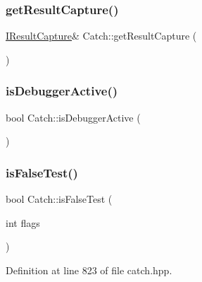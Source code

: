 \hypertarget{namespace_catch_aff60c1de6ac6cea30175d70e33d83c8e}{}\label{namespace_catch_aff60c1de6ac6cea30175d70e33d83c8e} 
\subsubsection{\texorpdfstring{get\+Result\+Capture()}{getResultCapture()}}
{\footnotesize\ttfamily \hyperlink{struct_catch_1_1_i_result_capture}{I\+Result\+Capture}\& Catch\+::get\+Result\+Capture (\begin{DoxyParamCaption}{ }\end{DoxyParamCaption})}

\hypertarget{namespace_catch_ab079497368fb1df25af39ad494d2a241}{}\label{namespace_catch_ab079497368fb1df25af39ad494d2a241} 
\subsubsection{\texorpdfstring{is\+Debugger\+Active()}{isDebuggerActive()}}
{\footnotesize\ttfamily bool Catch\+::is\+Debugger\+Active (\begin{DoxyParamCaption}{ }\end{DoxyParamCaption})}

\hypertarget{namespace_catch_a93ef4e3e307a2021ca0d41b32c0e54b0}{}\label{namespace_catch_a93ef4e3e307a2021ca0d41b32c0e54b0} 
\subsubsection{\texorpdfstring{is\+False\+Test()}{isFalseTest()}}
{\footnotesize\ttfamily bool Catch\+::is\+False\+Test (\begin{DoxyParamCaption}\item[{int}]{flags }\end{DoxyParamCaption})\hspace{0.3cm}{\ttfamily [inline]}}



Definition at line 823 of file catch.\+hpp.

\hypertarget{namespace_catch_a54b01af61673a3e1f21f31713639b180}{}\label{namespace_catch_a54b01af61673a3e1f21f31713639b180} 
